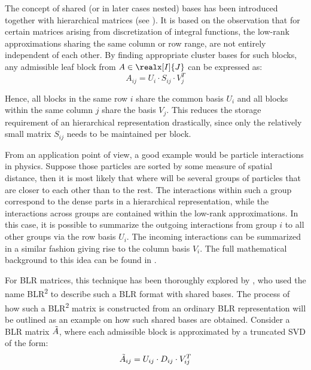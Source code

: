 The concept of shared (or in later cases nested) bases has been introduced together with hierarchical matrices (see \cite{hackbusch_hierarchical_2004}). It is based on the observation that for certain matrices arising from discretization of integral functions, the low-rank approximations sharing the same column or row range, are not entirely independent of each other. By finding appropriate cluster bases for such blocks, any admissible leaf block from $A \in \realx[I]{J}$ can be expressed as:
\begin{equation}
    A_{ij}=U_i\cdot S_{ij}\cdot V_j^T
\end{equation}

\noindent Hence, all blocks in the same row $i$ share the common basis $U_i$ and all blocks within the same column $j$ share the basis $V_j$. This reduces the storage requirement of an hierarchical representation drastically, since only the relatively small matrix $S_{ij}$ needs to be maintained per block.

From an application point of view, a good example would be particle interactions in physics. Suppose those particles are sorted by some measure of spatial distance, then it is most likely that where will be several groups of particles that are closer to each other than to the rest. The interactions within such a group correspond to the dense parts in a hierarchical representation, while the interactions across groups are contained within the low-rank approximations. In this case, it is possible to summarize the outgoing interactions from group $i$ to all other groups via the row basis $U_i$. The incoming interactions can be summarized in a similar fashion giving rise to the column basis $V_i$. The full mathematical background to this idea can be found in \cite{hackbusch_h2-matrix_2002}.

For BLR matrices, this technique has been thoroughly explored by \cite{ashcraft_block_2020}, who used the 
name BLR\textsuperscript{2} to describe such a BLR format with shared bases. The process of how such a BLR\textsuperscript{2} matrix is constructed from an ordinary BLR representation will be outlined as an example on how such shared bases are obtained. Consider a BLR matrix $\Tilde{A}$, where each admissible block is approximated by a truncated SVD of the form:
\begin{equation}
    \Tilde{A}_{ij} = U_{ij}\cdot D_{ij}\cdot V_{ij}^T
\end{equation}

